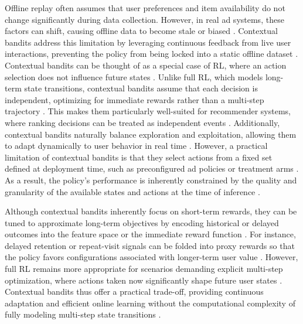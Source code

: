 \documentclass[manuscript,review,screen]{acmart}
\begin{document}
Offline replay often assumes that user preferences and item availability do not change significantly during data collection. However, in real ad systems, these factors can shift, causing offline data to become stale or biased \cite{levine2020offline, agarwal2014taming}. Contextual bandits address this limitation by leveraging continuous feedback from live user interactions, preventing the policy from being locked into a static offline dataset \cite{li2010contextual}. Contextual bandits can be thought of as a special case of RL, where an action selection does not influence future states \cite{bubeck2012regret, Sutton1998}. Unlike full RL, which models long-term state transitions, contextual bandits assume that each decision is independent, optimizing for immediate rewards rather than a multi-step trajectory \cite{bubeck2012regret, Sutton1998}. This makes them particularly well-suited for recommender systems, where ranking decisions can be treated as independent events \cite{afsar2022reinforcement, zhou2016latent}. Additionally, contextual bandits naturally balance exploration and exploitation, allowing them to adapt dynamically to user behavior in real time \cite{li2010contextual}. However, a practical limitation of contextual bandits is that they select actions from a fixed set defined at deployment time, such as preconfigured ad policies or treatment arms \cite{bietti2021contextual}. As a result, the policy’s performance is inherently constrained by the quality and granularity of the available states and actions at the time of inference \cite{dimitrakakis2018decision}.

Although contextual bandits inherently focus on short-term rewards, they can be tuned to approximate long-term objectives by encoding historical or delayed outcomes into the feature space or the immediate reward function \cite{mcdonald2023impatient, wu2017returning}. For instance, delayed retention or repeat-visit signals can be folded into proxy rewards so that the policy favors configurations associated with longer-term user value \cite{yi2023progressive}. However, full RL remains more appropriate for scenarios demanding explicit multi-step optimization, where actions taken now significantly shape future user states \cite{gauci2018horizon}. Contextual bandits thus offer a practical trade-off, providing continuous adaptation and efficient online learning without the computational complexity of fully modeling multi-step state transitions \cite{gauci2018horizon, levine2020offline}.
\end{document}
